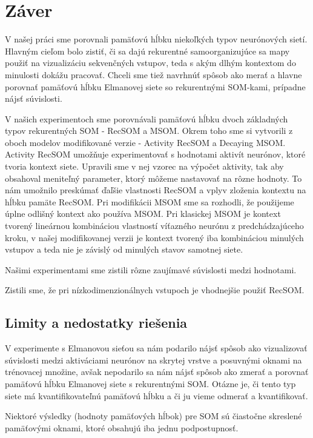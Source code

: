 \chapter*{Záver}
V našej práci sme porovnali pamäťovú hĺbku niekoľkých typov neurónových sietí.
Hlavným cieľom bolo zistiť, či sa dajú rekurentné samoorganizujúce sa mapy použiť na vizualizáciu
sekvenčných vstupov, teda s akým dlhým kontextom do minulosti dokážu pracovať. Chceli sme tiež navrhnúť 
spôsob ako merať a hlavne porovnať pamäťovú hĺbku Elmanovej siete so rekurentnými SOM-kami, prípadne 
nájsť súvislosti.

V našich experimentoch sme porovnávali pamäťovú hĺbku dvoch základných typov rekurentných 
SOM - RecSOM a MSOM. Okrem toho sme si vytvorili z oboch modelov modifikované verzie - Activity RecSOM a Decaying MSOM.
Activity RecSOM umožňuje experimentovať s hodnotami aktivít neurónov, ktoré tvoria kontext siete. Upravili sme v nej
vzorec na výpočet aktivity, tak aby obsahoval meniteľný parameter, ktorý môžeme nastavovať na rôzne hodnoty.
To nám umožnilo preskúmať ďaľšie vlastnosti RecSOM a vplyv zloženia kontextu na hĺbku pamäte RecSOM.
Pri modifikácii MSOM sme sa rozhodli, že použijeme úplne odlišný kontext ako používa MSOM. Pri klasickej MSOM
je kontext tvorený lineárnou kombináciou vlastností víťazného neurónu z predchádzajúceho kroku, v našej modifikovanej 
verzii je kontext tvorený iba kombináciou minulých vstupov a teda nie je závislý od minulých stavov samotnej siete.

Našimi experimentami sme zistili rôzne zaujímavé súvislosti medzi hodnotami.

Zistili sme, že pri nízkodimenzionálnych vstupoch je vhodnejšie použiť RecSOM.


\section{Limity a nedostatky riešenia}
V experimente s Elmanovou sieťou sa nám podarilo nájsť spôsob ako vizualizovať súvislosti medzi 
aktiváciami neurónov na skrytej vrstve a posuvnými oknami na trénovacej množine, avšak 
nepodarilo sa nám nájsť spôsob ako zmerať a porovnať pamäťovú hĺbku Elmanovej siete s rekurentnými SOM.
Otázne je, či tento typ siete má kvantifikovateľnú pamäťovú hĺbku a či ju vieme odmerať a kvantifikovať.

Niektoré výsledky (hodnoty pamäťových hĺbok) pre SOM sú čiastočne skreslené
pamäťovými oknami, ktoré obsahujú iba jednu podpostupnosť.

